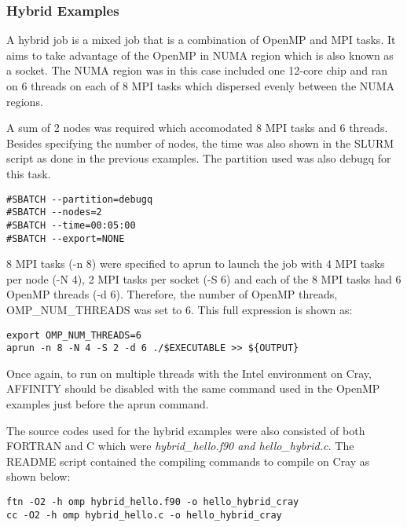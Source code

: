 \subsubsection{Hybrid Examples}

A hybrid job is a mixed job that is a combination of OpenMP and MPI tasks. It aims to take advantage of the OpenMP in NUMA region which is also known as 
a socket. The NUMA region was in this case included one 12-core chip and ran on 6 threads on each of 8 MPI tasks which dispersed evenly between 
the NUMA regions.

A sum of 2 nodes was required which accomodated 8 MPI tasks and 6 threads. Besides specifying the number of nodes, the time was also shown in the SLURM 
script as done in the previous examples. The partition used was also debugq for this task.

\begin{tcolorbox}
\begin{Verbatim}[fontsize=\scriptsize]
#SBATCH --partition=debugq
#SBATCH --nodes=2
#SBATCH --time=00:05:00
#SBATCH --export=NONE
\end{Verbatim}
\end{tcolorbox}


8 MPI tasks (-n 8) were specified to aprun to launch the job with 4 MPI tasks per node (-N 4), 2 MPI tasks per socket (-S 6) and each of the 8 MPI tasks 
had 6 OpenMP threads (-d 6). Therefore, the number of OpenMP threads, OMP\_NUM\_THREADS was set to 6. This full expression is shown as:

\begin{tcolorbox}
\begin{Verbatim}[fontsize=\scriptsize]
export OMP_NUM_THREADS=6
aprun -n 8 -N 4 -S 2 -d 6 ./$EXECUTABLE >> ${OUTPUT}
\end{Verbatim}
\end{tcolorbox}

Once again, to run on multiple threads with the Intel environment on Cray, AFFINITY should be disabled with the same command used in the OpenMP examples
just before the aprun command.

The source codes used for the hybrid examples were also consisted of both FORTRAN and C which were \emph{hybrid\_hello.f90 and hello\_hybrid.c.} The 
README script contained the compiling commands to compile on Cray as shown below:

\begin{tcolorbox}
\begin{Verbatim}[fontsize=\scriptsize]
ftn -O2 -h omp hybrid_hello.f90 -o hello_hybrid_cray
cc -O2 -h omp hybrid_hello.c -o hello_hybrid_cray
\end{Verbatim}
\end{tcolorbox}

